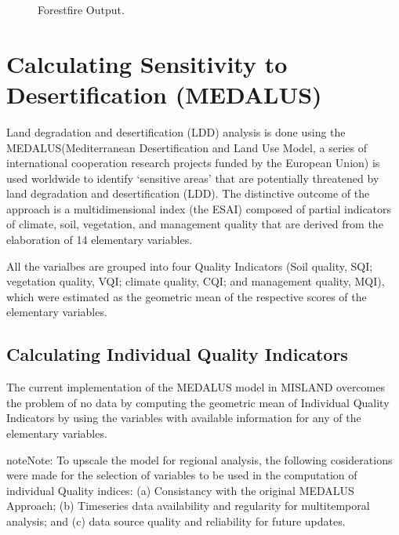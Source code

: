 \documentclass[letterpaper,10pt,english]{sphinxmanual}
\let\sphinxpxdimen\pdfpxdimen\else\newdimen\sphinxpxdimen
\begin{document}
\begin{figure}[H]
\centering
\capstart

\noindent\sphinxincludegraphics[width=793\sphinxpxdimen,height=350\sphinxpxdimen]{{fireoutput}.png}
\caption{Forest\sphinxhyphen{}fire Output.}\label{\detokenize{Service/Calculate_Forestloss:id9}}\end{figure}

\sphinxstepscope


\chapter{Calculating Sensitivity to Desertification (MEDALUS)}
\label{\detokenize{Service/Calculate_Medalus:calculating-sensitivity-to-desertification-medalus}}\label{\detokenize{Service/Calculate_Medalus::doc}}
\sphinxAtStartPar
Land degradation and desertification (LDD) analysis is done using the MEDALUS\textendash{}(Mediterranean Desertification and Land Use Model, a series of international cooperation research projects funded by the European Union) is used worldwide to identify ‘sensitive areas’ that are potentially threatened by land degradation and desertification (LDD). The distinctive outcome of the approach is a multidimensional index (the ESAI) composed of partial indicators of climate, soil, vegetation, and management quality that are derived from the elaboration of 14 elementary variables.

\sphinxAtStartPar
All the varialbes are grouped into four Quality Indicators (Soil quality, SQI; vegetation quality, VQI; climate quality, CQI; and management quality, MQI), which were estimated as the geometric mean of the respective scores of the elementary variables.


\section{Calculating Individual Quality Indicators}
\label{\detokenize{Service/Calculate_Medalus:calculating-individual-quality-indicators}}
\sphinxAtStartPar
The current implementation of the MEDALUS model in MISLAND overcomes the problem of no data by computing the geometric mean of Individual Quality Indicators by using the variables with available information for any of the elementary variables.

\begin{sphinxadmonition}{note}{Note:}
\sphinxAtStartPar
To upscale the model for regional analysis, the following cosiderations were made for the selection of variables to be used in the computation of individual Quality indices: (a) Consistancy with the original MEDALUS Approach; (b) Time\sphinxhyphen{}series data availability and regularity for multi\sphinxhyphen{}temporal analysis; and (c) data source quality and reliability for future updates.
\end{sphinxadmonition}
\end{document}
